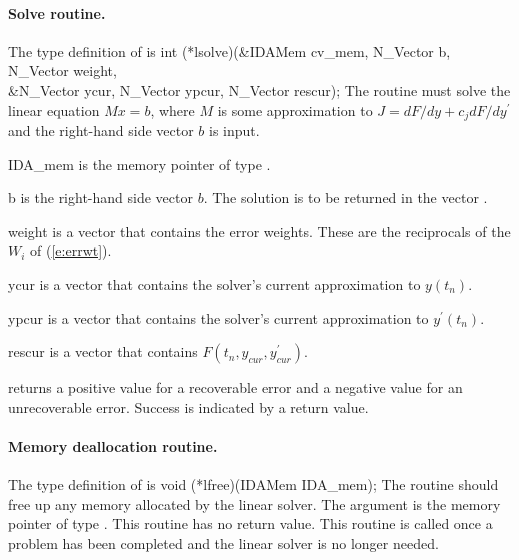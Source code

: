 \paragraph{Solve routine.}
The type definition of  is
{
  int (*lsolve)(&IDAMem cv\_mem, N\_Vector b, N\_Vector weight, \\
                &N\_Vector ycur, N\_Vector ypcur, N\_Vector rescur);  
}
{
  The routine  must solve the linear equation $M x = b$, where         
  $M$ is some approximation to $J = dF/dy + c_j dF/dy^\prime$  
  and the right-hand side vector $b$ is input. 
}
{
  \begin{args}
  \item[IDA\_mem]
    is the {\ida} memory pointer of type .
  \item[b]
    is the right-hand side vector $b$. The solution is to be    
    returned in the vector .
  \item[weight]
    is a vector that contains the error weights.
    These are the reciprocals of the $W_i$ of (\ref{e:errwt}).
  \item[ycur]
    is a vector that contains the solver's current approximation to $y(t_n)$.
  \item[ypcur]
    is a vector that contains the solver's current approximation to $y^\prime(t_n)$.
  \item[rescur]
    is a vector that contains $F(t_n,y_{cur},y_{cur}^\prime)$. 
  \end{args}
}
{
   returns a positive value    
  for a recoverable error and a negative value for an             
  unrecoverable error. Success is indicated by a  return value.
}
{}


\paragraph{Memory deallocation routine.}
The type definition of  is
{
  void (*lfree)(IDAMem IDA\_mem);
}
{
  The routine  should free up any memory allocated by the linear
  solver.
}
{
  The argument  is the {\ida} memory pointer of type .
}
{
  This routine has no return value.
}
{
  This routine is called once a problem has been completed and the 
  linear solver is no longer needed.
}